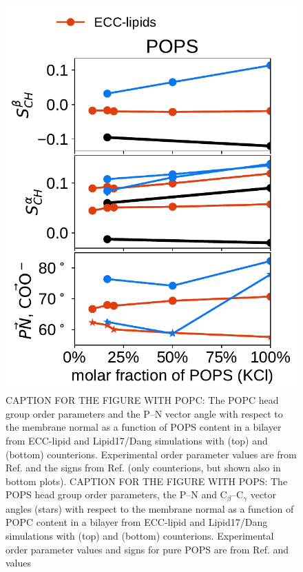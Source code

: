 \documentclass[journal=jpcbfk,manuscript=article]{achemso}
\newlength{\figheightsmall}
\newlength{\figheight}
\begin{document}
\begin{figure}[!tbp]
  \includegraphics[height=\figheightsmall]{../Fig/order_parameters_changes_A-B_PC-PS_mix_POPS_kcl.pdf} 
  \caption{\label{fig:delta_ordPar_NaCl_PC-PS_mix} 
    CAPTION FOR THE FIGURE WITH POPC: The POPC head group order parameters and the P--N vector angle
    with respect to the membrane normal as a function of POPS content in a bilayer
    from ECC-lipid and Lipid17/Dang simulations with  (top) and  (bottom) counterions.
    Experimental order parameter values are from Ref. 
    and the signs from Ref.  (only  counterions, but shown also in bottom plots).
    CAPTION FOR THE FIGURE WITH POPS: The POPS head group order parameters, the P--N and C$_\beta$--C$_\gamma$ vector angles (stars)
    with respect to the membrane normal as a function of POPC content in a bilayer
    from ECC-lipid and Lipid17/Dang simulations with  (top) and  (bottom) counterions.
    Experimental order parameter values and signs for pure POPS are from Ref.  and values
}
\end{figure}
\end{document}
